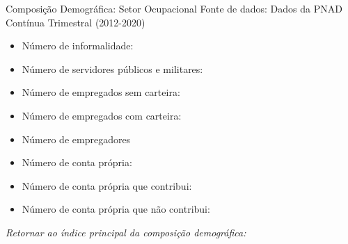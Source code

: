\begin{frame}[label=_composicao_demografica_setor]{Composição Demográfica: Setor Ocupacional}
{\footnotesize Fonte de dados: Dados da PNAD Contínua Trimestral (2012-2020)}
\begin{itemize}
\item{Número de informalidade: \hyperlink{_composicao_demografica_setor_n_de_informalidade}{}}
\item{Número de servidores públicos e militares: \hyperlink{_composicao_demografica_setor_n_militar}{}}
\item{Número de empregados sem carteira: \hyperlink{_composicao_demografica_setor_n_empregadoSC}{}}
\item{Número de empregados com carteira: \hyperlink{_composicao_demografica_setor_n_empregadoCC}{}}
\item{Número de empregadores \hyperlink{_composicao_demografica_setor_n_empregador}{}}
\item{Número de conta própria: \hyperlink{_composicao_demografica_setor_n_cpropria}{}}
\item{Número de conta própria que contribui: \hyperlink{_composicao_demografica_setor_n_cpropriaC}{}}
\item{Número de conta própria que não contribui: \hyperlink{_composicao_demografica_setor_n_cpropriaNc}{}}
\end{itemize}

\begin{small}
\textit{Retornar ao índice principal da composição demográfica: \hyperlink{_composicao_demografica}{} }
\end{small}

\end{frame}



